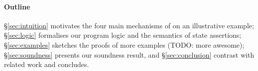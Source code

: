 \paragraph{Outline}
\S\ref{sec:intuition} motivates the four main mechanisms of \colosl on
an illustrative example; \S\ref{sec:logic} formalises our program
logic and the semantics of state assertions; \S\ref{sec:examples}
sketches the proofs of more examples (TODO: more awesome);
\S\ref{sec:soundness} presents our soundness result, and
\S\ref{sec:conclusion} contrast with related work and concludes.
